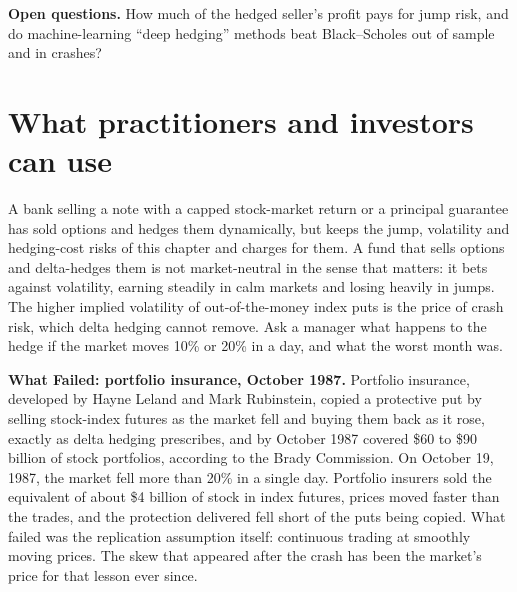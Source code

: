\label{sec:14-open}
\textbf{Open questions.} How much of the hedged seller's profit pays for jump risk, and do machine-learning ``deep hedging'' methods beat Black--Scholes out of sample and in crashes?

\section{What practitioners and investors can use}
\label{sec:14-investors}

A bank selling a note with a capped stock-market return or a principal guarantee has sold options and hedges them dynamically, but keeps the jump, volatility and hedging-cost risks of this chapter and charges for them. A fund that sells options and delta-hedges them is not market-neutral in the sense that matters: it bets against volatility, earning steadily in calm markets and losing heavily in jumps. The higher implied volatility of out-of-the-money index puts is the price of crash risk, which delta hedging cannot remove. Ask a manager what happens to the hedge if the market moves 10\% or 20\% in a day, and what the worst month was.

\begin{callout}
\textbf{What Failed: portfolio insurance, October 1987.} Portfolio insurance, developed by Hayne Leland and Mark Rubinstein, copied a protective put by selling stock-index futures as the market fell and buying them back as it rose, exactly as delta hedging prescribes, and by October 1987 covered \$60 to \$90 billion of stock portfolios, according to the Brady Commission. On October 19, 1987, the market fell more than 20\% in a single day. Portfolio insurers sold the equivalent of about \$4 billion of stock in index futures, prices moved faster than the trades, and the protection delivered fell short of the puts being copied. What failed was the replication assumption itself: continuous trading at smoothly moving prices. The skew that appeared after the crash has been the market's price for that lesson ever since.
\end{callout}

\makeatletter
{}
\makeatother

